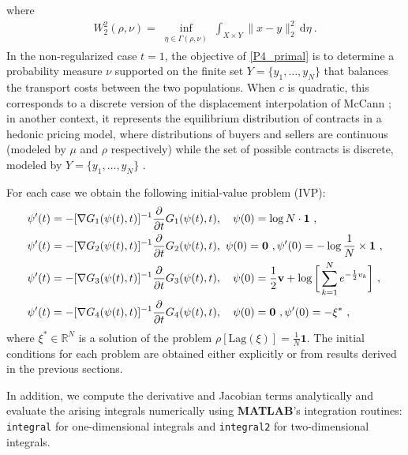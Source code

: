 \documentclass{scrartcl}
\theoremstyle{plain}
\theoremstyle{definition}
\begin{document}
where 
\begin{gather*}
    W^2_2(\rho,\nu) = \inf_{\substack{\eta\in\Gamma(\rho,\nu)}} \int_{X\times Y} \|x-y\|_2^2\,\mathrm{d}\eta\ .
\end{gather*}
In the non-regularized case $t=1$, the objective of \eqref{P4_primal} is to determine a probability measure $\nu$ supported on the finite set $Y=\{y_1,\dots,y_N\}$ that balances the transport costs between the two populations. When $c$ is quadratic, this corresponds to a discrete version of the displacement interpolation of McCann \cite{McCann1997}; in another context, it represents the equilibrium distribution of contracts in a hedonic pricing model, where distributions of buyers and sellers are continuous (modeled by $\mu$ and $\rho$ respectively) while the set of possible contracts is discrete, modeled by $Y=\{y_1,...,y_N\}$ \cite{COCV_2005__11_1_57_0}.

For each case we obtain the following initial-value problem (IVP):
\renewcommand\theequation{P\arabic{equation}} \setcounter{equation}{0}
\begin{align}
        \psi'(t) &= -[\nabla G_1(\psi(t), t)]^{-1} \frac{\partial}{\partial t} G_1(\psi(t), t), \quad \psi(0) = \log N \cdot \mathbf{1}\ , 
        \label{prob1_ODE}\\
        \psi'(t) &= - [\nabla G_2(\psi(t),t)]^{-1}\frac{\partial}{\partial t}G_2(\psi(t),t), \ \psi(0) = \mathbf{0}\ , \psi'(0) = -\log{\frac{1}{N}}\times \mathbf{1}\ ,\label{prob2_ODE}\\
        \psi'(t) &= -[\nabla G_3(\psi(t), t)]^{-1} \frac{\partial}{\partial t} G_3(\psi(t), t), \quad \psi(0) = \frac{1}{2}\mathbf{v} + \log \bigg{[}\sum_{k=1}^Ne^{-\frac{1}{2}v_k}\bigg{]}\ ,\label{prob3_ODE}\\
        \psi'(t) &= -[\nabla G_4(\psi(t), t)]^{-1} \frac{\partial}{\partial t} G_4(\psi(t), t), \quad \psi(0) = \mathbf{0}\ , \psi'(0) = -\xi^*\ , \label{prob4_ODE}
\end{align}
where $\xi^*\in\mathbb{R}^N$ is a solution of the problem $\rho[\mathrm{Lag}(\xi)]=\frac{1}{N}\mathbf{1}$. The initial conditions for each problem are obtained either explicitly or from results derived in the previous sections.

In addition, we compute the derivative and Jacobian terms analytically and evaluate the arising integrals numerically using \textbf{MATLAB}'s integration routines: \texttt{integral} for one-dimensional integrals and \texttt{integral2} for two-dimensional integrals.
\end{document}
